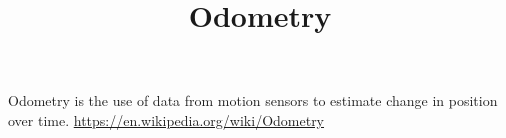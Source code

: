 \documentclass[a4paper]{article}
\title{Odometry}
\date{}
\begin{document}
    \maketitle
    Odometry is the use of data from motion sensors to estimate change in position over time. \url{https://en.wikipedia.org/wiki/Odometry}
\end{document}
